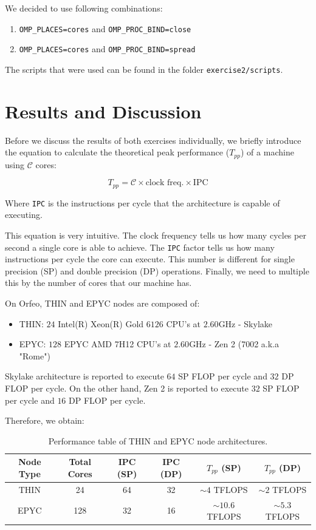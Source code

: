 \documentclass{report}
\begin{document}
We decided to use following combinations:
\begin{enumerate}
    \item \texttt{OMP\_PLACES=cores} and \texttt{OMP\_PROC\_BIND=close} 
    \item \texttt{OMP\_PLACES=cores} and \texttt{OMP\_PROC\_BIND=spread} 
\end{enumerate}

The scripts that were used can be found in the folder \texttt{exercise2/scripts}.

\section{Results and Discussion}

Before we discuss the results of both exercises individually, we briefly 
introduce the equation to calculate the theoretical peak performance ($T_{pp}$) 
of a machine using $\mathcal{C}$ cores:

\begin{equation}\label{eq:perf}
    T_{pp} = \mathcal{C}\times \text{clock freq.} \times \text{IPC}
\end{equation}

Where \texttt{IPC} is the instructions per cycle that the architecture 
is capable of executing.

This equation is very intuitive. The clock frequency tells us how many cycles 
per second a single core is able to achieve. The \texttt{IPC} factor tells us how many 
instructions per cycle the core can execute. This number is different for 
single precision (SP) and double precision (DP) operations. Finally, we need 
to multiple this by the number of cores that our machine has. 

On Orfeo, THIN and EPYC nodes are composed of: 
\begin{itemize}
    \item THIN: $24$ Intel(R) Xeon(R) Gold $6126$ CPU's at $2.60$GHz - Skylake
    \item EPYC: $128$ EPYC AMD 7H12 CPU's at $2.60$GHz - Zen 2 (7002 a.k.a "Rome")
\end{itemize}

Skylake architecture is reported\cite{arch} to execute $64$ SP FLOP per cycle 
and $32$ DP FLOP per cycle. On the other hand, Zen 2 is reported\cite{arch} to execute 
$32$ SP FLOP per cycle and $16$ DP FLOP per cycle.

Therefore, we obtain: 

\begin{table}[H]
\centering
\begin{tabular}{|c|c|c|c|c|c|}
    \hline
    Node Type & Total Cores & IPC (SP) & IPC (DP) & $T_{pp}$ (SP) & $T_{pp}$ (DP)\\\hline
    THIN      &     24      &    64    &   32     & $\sim 4$ TFLOPS & $\sim 2$ TFLOPS \\
    EPYC      &    128      &    32    &   16     & $\sim 10.6$ TFLOPS & $\sim 5.3$ TFLOPS \\ \hline
\end{tabular}
\caption{\label{tab:perf}Performance table of THIN and EPYC node architectures.}
\end{table}
\end{document}
